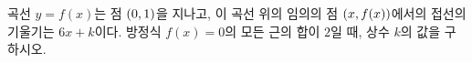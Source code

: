 곡선 $y=f(x)$는 점 $(0{,}\mkern3mu\mathopen{}1)$을 지나고, 이 곡선 위의 임의의 점 $(x{,}\mkern3mu\mathopen{}f(x))$에서의 접선의 기울기는 $6x+k$이다. 방정식 $f(x)=0$의 모든 근의 합이 $2$일 때, 상수 $k$의 값을 구하시오.
